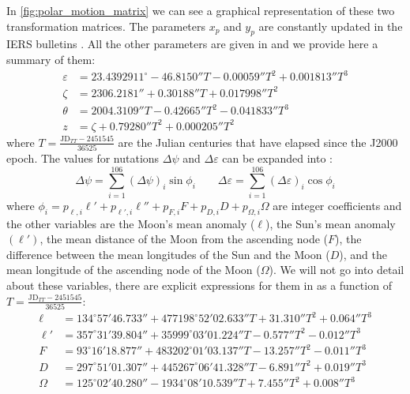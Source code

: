 \documentclass[../main.tex]{subfiles}
\begin{document}
In \cref{fig:polar_motion_matrix} we can see a graphical representation of these two transformation matrices. The parameters $x_p$ and $y_p$ are constantly updated in the IERS bulletins \cite{iersbulletinA}. All the other parameters are given in \cite{lieske} and we provide here a summary of them:
\begin{align}
  \varepsilon & = 23.4392911^\circ -46.8150''T - 0.00059''T^2 + 0.001813''T^3 \\
  \zeta       & = 2306.2181''+ 0.30188''T + 0.017998''T^2                     \\
  \theta      & = 2004.3109''T- 0.42665''T^2 - 0.041833''T^3                  \\
  z           & = \zeta + 0.79280''T^2+0.000205''T^2
\end{align}
where $T=\frac{\text{JD}_{TT} - 2451545}{36525}$ are the Julian centuries that have elapsed since the J2000 epoch. The values for nutations $\Delta \psi$ and $\Delta \varepsilon$ can be expanded into \cite{montenbruck}:
\begin{equation}
  \Delta\psi = \sum_{i=1}^106 {(\Delta\psi)}_i\sin \phi_i\qquad \Delta\varepsilon = \sum_{i=1}^106 {(\Delta\varepsilon)}_i\cos \phi_i
\end{equation}
where $\phi_i=p_{\ell,i}\ell'+ p_{\ell',i}\ell''+p_{F,i}F+p_{D,i}D+p_{\Omega,i}\Omega$ are integer coefficients and the other variables are the Moon's mean anomaly ($\ell$), the Sun's mean anomaly $(\ell')$, the mean distance of the Moon from the ascending node ($F$), the difference between the mean longitudes of the Sun and the Moon ($D$), and the mean longitude of the ascending node of the Moon ($\Omega$). We will not go into detail about these variables, there are explicit expressions for them in \cite{montenbruck} as a function of $T=\frac{\text{JD}_{TT} - 2451545}{36525}$:
\begin{align}
  \ell   & = 134^\circ 57' 46.733'' + 477198^\circ 52' 02.633'' T + 31.310'' T^2 + 0.064'' T^3 \\
  \ell'  & = 357^\circ 31' 39.804'' + 35999^\circ 03'01.224'' T - 0.577'' T^2 - 0.012'' T^3    \\
  F      & = 93^\circ 16' 18.877'' + 483202^\circ 01' 03.137'' T - 13.257'' T^2 - 0.011'' T^3  \\
  D      & = 297^\circ 51' 01.307'' + 445267^\circ 06' 41.328'' T - 6.891'' T^2 + 0.019'' T^3  \\
  \Omega & = 125^\circ 02' 40.280'' - 1934^\circ 08' 10.539'' T + 7.455'' T^2 + 0.008'' T^3
\end{align}
\end{document}
